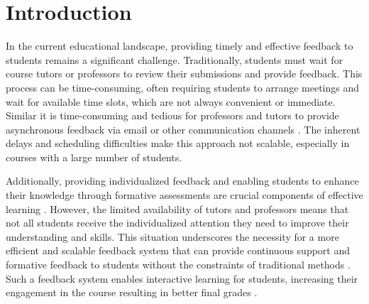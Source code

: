 \documentclass[manuscript,screen,review]{acmart}
\begin{document}



\maketitle

\section{Introduction} %


In the current educational landscape, providing timely and effective feedback to students remains a significant challenge.
Traditionally, students must wait for course tutors or professors to review their submissions and provide feedback.
This process can be time-consuming, often requiring students to arrange meetings and wait for available time slots, which are not always convenient or immediate.
Similar it is time-consuming and tedious for professors and tutors to provide asynchronous feedback via email or other communication channels \cite{henderson:2019:ChallengesFeedbackHigher}.
The inherent delays and scheduling difficulties make this approach not scalable, especially in courses with a large number of students.

Additionally, providing individualized feedback and enabling students to enhance their knowledge through formative assessments are crucial components of effective learning \cite{irons:2007:EnhancingLearningFormative,higgins:2002:ConscientiousConsumerReconsidering}.
However, the limited availability of tutors and professors means that not all students receive the individualized attention they need to improve their understanding and skills.
This situation underscores the necessity for a more efficient and scalable feedback system that can provide continuous support and formative feedback to students without the constraints of traditional methods \cite{sondergaard:2004:EffectiveFeedbackSmall}.
Such a feedback system enables interactive learning for students, increasing their engagement in the course resulting in better final grades \cite{krusche:2017:InteractiveLearningIncreasing}.
\end{document}
